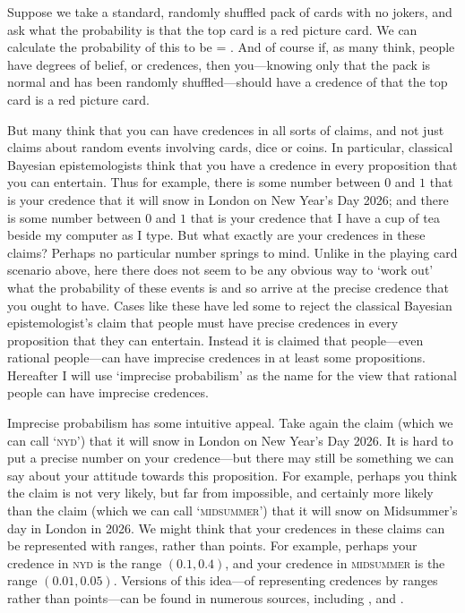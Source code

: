 Suppose we take a standard, randomly shuffled pack of cards with no jokers, and ask what the probability is that the top card is a red picture card. We can calculate the probability of this to be  = . And of course if, as many think, people have degrees of belief, or credences, then you---knowing only that the pack is normal and has been randomly shuffled---should have a credence of  that the top card is a red picture card.

But many think that you can have credences in all sorts of claims, and not just claims about random events involving cards, dice or coins. In particular, classical Bayesian epistemologists think that you have a credence in every proposition that you can entertain. Thus for example, there is some number between $0$ and $1$ that is your credence that it will snow in London on New Year's Day 2026; and there is some number between $0$ and $1$ that is your credence that I have a cup of tea beside my computer as I type. But what exactly are your credences in these claims? Perhaps no particular number springs to mind. Unlike in the playing card scenario above, here there does not seem to be any obvious way to `work out' what the probability of these events is and so arrive at the precise credence that you ought to have. Cases like these have led some to reject the classical Bayesian epistemologist's claim that people must have precise credences in every proposition that they can entertain. Instead it is claimed that people---even rational people---can have imprecise credences in at least some propositions. Hereafter I will use `imprecise probabilism' as the name for the view that rational people can have imprecise credences. 

Imprecise probabilism has some intuitive appeal. Take again the claim (which we can call `\textsc{nyd}') that it will snow in London on New Year's Day 2026. It is hard to put a precise number on your credence---but there may still be something we can say about your attitude towards this proposition. For example, perhaps you think the claim is not very likely, but far from impossible, and certainly more likely than the claim (which we can call `\textsc{midsummer}') that it will snow on Midsummer's day in London in 2026. We might think that your credences in these claims can be represented with ranges, rather than points.  For example, perhaps your credence in \textsc{nyd} is the range $(0.1, 0.4)$, and your credence in \textsc{midsummer} is the range $(0.01, 0.05)$.  Versions of this idea---of representing credences by ranges rather than points---can be found in numerous sources, including \citet{bradley2009,gardenforssahlin1982,jeffrey1983humanface,Joyce2005,Kaplan1996,keynes1921,kyburg1983,levi1974,sturgeon2008,vanfraassen2006}, and \citet{walley1991}. 

